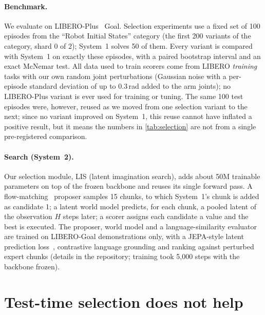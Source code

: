 \documentclass[11pt]{article}
\begin{document}
\paragraph{Benchmark.} We evaluate on LIBERO-Plus~\citep{fei2025liberoplus} Goal. Selection experiments use a fixed set of 100 episodes from the ``Robot Initial States'' category (the first 200 variants of the category, shard 0 of 2); System~1 solves 50 of them. Every variant is compared with System~1 on exactly these episodes, with a paired bootstrap interval and an exact McNemar test. All data used to train scorers come from LIBERO \emph{training} tasks with our own random joint perturbations (Gaussian noise with a per-episode standard deviation of up to 0.3\,rad added to the arm joints); no LIBERO-Plus variant is ever used for training or tuning. The same 100 test episodes were, however, reused as we moved from one selection variant to the next; since no variant improved on System~1, this reuse cannot have inflated a positive result, but it means the numbers in \cref{tab:selection} are not from a single pre-registered comparison.



\paragraph{Search (System~2).} Our selection module, LIS (latent imagination search), adds about 50M trainable parameters on top of the frozen backbone and reuses its single forward pass. A flow-matching~\citep{lipman2022flow,liu2022rectified} proposer samples 15 chunks, to which System~1's chunk is added as candidate 1; a latent world model predicts, for each chunk, a pooled latent of the observation $H$ steps later; a scorer assigns each candidate a value and the best is executed. The proposer, world model and a language-similarity evaluator are trained on LIBERO-Goal demonstrations only, with a JEPA-style latent prediction loss~\citep{assran2023ijepa}, contrastive language grounding and ranking against perturbed expert chunks (details in the repository; training took 5{,}000 steps with the backbone frozen).

\section{Test-time selection does not help}
\label{sec:selection}
\end{document}
